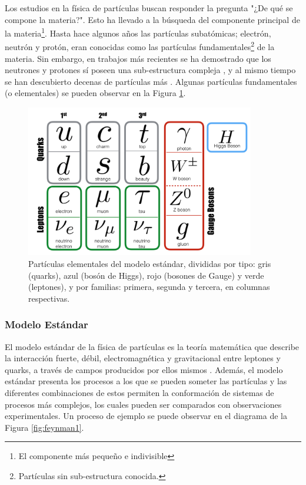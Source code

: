 Los estudios en la física de partículas buscan responder la pregunta "¿De qué se compone la materia?". Esto ha llevado a la búsqueda del componente principal de la materia\footnote{El componente más pequeño e indivisible}. Hasta hace algunos años las partículas subatómicas; electrón, neutrón y protón, eran conocidas como las partículas fundamentales\footnote{Partículas sin sub-estructura conocida.} de la materia. Sin embargo, en trabajos más recientes se ha demostrado que los neutrones y protones sí poseen una sub-estructura compleja \cite{Griffiths}, y al mismo tiempo se han descubierto decenas de partículas más \cite{PhysRevD.98.030001}. Algunas partículas fundamentales (o elementales) se pueden observar en la Figura \ref{fig:partics}.

\begin{figure}[h]
  \centering
  \includegraphics[width=10cm]{figures/image10.png}
  \caption[Diagrama del modelo estándar.]{Partículas elementales del modelo estándar, divididas por tipo: gris (quarks), azul (bosón de Higgs), rojo (bosones de Gauge) y verde (leptones), y por familias: primera, segunda y tercera, en columnas respectivas.
  }
  \label{fig:partics}
\end{figure}

\subsubsection{Modelo Estándar}
El modelo estándar de la física de partículas es la teoría matemática que describe la interacción fuerte, débil, electromagnética y gravitacional entre leptones y quarks, a través de campos producidos por ellos mismos \cite{Cottingham}. Además, el modelo estándar presenta los procesos a los que se pueden someter las partículas y las diferentes combinaciones de estos permiten la conformación de sistemas de procesos más complejos, los cuales pueden ser comparados con observaciones experimentales. Un proceso de ejemplo se puede observar en el diagrama de la Figura \ref{fig:feynman1}.

